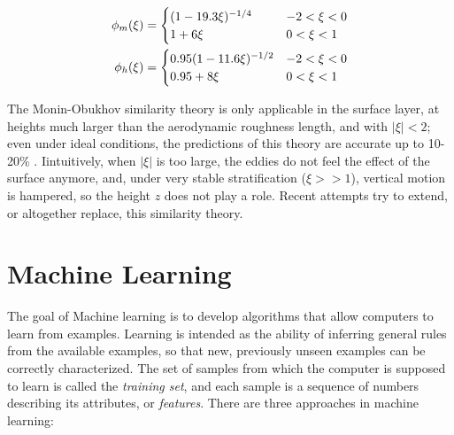 \documentclass[a4paper]{book}
\begin{document}
\begin{align}
\phi_m(\xi)&=\begin{cases}
\label{eq:phi_m_coeff}
\mathrlap{(1-19.3\xi)^{-1/4}} \hphantom{0.95(1-11.6\xi)^{-1/2}} & -2<\xi<0 \\
1+6\xi & 0<\xi<1\\
\end{cases} \\
\phi_h(\xi)&=\begin{cases}
0.95(1-11.6\xi)^{-1/2} & -2<\xi<0 \\
0.95+8\xi & 0<\xi<1
\end{cases}
\end{align}


The Monin-Obukhov similarity theory is only applicable in the surface layer, at heights much larger than the aerodynamic roughness length, and with $\vert\xi\vert<2$; even under ideal conditions, the predictions of this theory are accurate up to 10-20\% \citep{50years}. Iintuitively, when $\vert\xi\vert$ is too large, the eddies do not feel the effect of the surface anymore, and, under very stable stratification ($\xi>>1$), vertical motion is hampered, so the height $z$ does not play a role. Recent attempts \citep{sheba_phim,most_teal,Wilson2008} try to extend, or altogether replace, this similarity theory.

\section{Machine Learning}
\label{sec:ml}
The goal of Machine learning is to develop algorithms that allow computers to learn from examples. Learning is intended as the ability of inferring general rules from the available examples, so that new, previously unseen examples can be correctly characterized. The set of samples from which the computer is supposed to learn is called the \emph{training set}, and each sample is a sequence of numbers describing its attributes, or \emph{features}. There are three approaches in machine learning:
\end{document}
